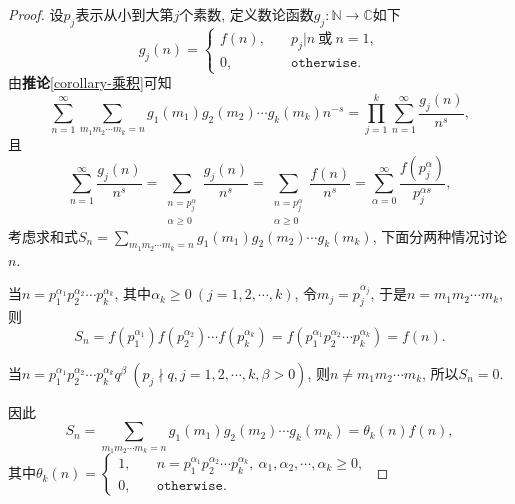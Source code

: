 \documentclass[12pt, a4paper, oneside]{ctexart}
\numberwithin{equation}{section}  %
\let\geq=\geqslant %
\def\N{\mathbb{N}}          %
\def\C{\mathbb{C}}          %
\def\add{\vspace{1ex}}      %
\begin{document}
\begin{proof}
    设$p_j$表示从小到大第$j$个素数, 定义数论函数$g_j:\N\to\C$如下
    \begin{equation*}
        g_j(n) = \begin{cases}
            f(n),&\quad p_j|n\ \text{或}\ n=1,\\
            0,&\quad\mathtt{otherwise}.
        \end{cases}
    \end{equation*}
    由\textbf{推论}\ref{corollary-乘积}可知
    \begin{equation}\label{eq-prod-1}
        \sum_{n=1}^\infty\sum_{m_1m_2\cdots m_k=n}g_1(m_1)g_2(m_2)\cdots g_k(m_k)n^{-s} = \prod_{j=1}^k\sum_{n=1}^\infty\frac{g_j(n)}{n^s},
    \end{equation}
    且
    \begin{equation}\label{eq-prod-2}
        \sum_{n=1}^\infty\frac{g_j(n)}{n^s}=\sum_{\substack{n=p_j^\alpha\\\alpha \geq 0}}\frac{g_j(n)}{n^s}=\sum_{\substack{n=p_j^\alpha\\\alpha \geq 0}}\frac{f(n)}{n^s}=\sum_{\alpha = 0}^\infty\frac{f(p_j^\alpha)}{p_j^{\alpha s}},
    \end{equation}
    考虑求和式$S_n = \sum_{m_1m_2\cdots m_k = n}g_1(m_1)g_2(m_2)\cdots g_k(m_k)$, 下面分两种情况讨论$n$.

    当$n=p_1^{\alpha_1}p_2^{\alpha_2}\cdots p_k^{\alpha_k}$, 其中$\alpha_k \geq 0\ (j=1,2,\cdots, k)$, 令$m_j = p_j^{\alpha_j}$, 于是$n = m_1m_2\cdots m_k$, 则
    \begin{equation*}
        S_n = f(p_1^{\alpha_1})f(p_2^{\alpha_2})\cdots f(p_k^{\alpha_k}) = f(p_1^{\alpha_1}p_2^{\alpha_2}\cdots p_k^{\alpha_k}) = f(n).
    \end{equation*}

    当$n = p_1^{\alpha _1}p_2^{\alpha_2}\cdots p_k^{\alpha_k}q^{\beta}\ (p_j\nmid q, j=1,2,\cdots, k, \beta > 0)$, 则$n \neq m_1m_2\cdots m_k$, 所以$S_n = 0$.

    因此
    \begin{equation}\label{eq-prod-3}
        S_n =\sum_{m_1m_2\cdots m_k = n}g_1(m_1)g_2(m_2)\cdots g_k(m_k) = \theta_k(n)f(n),
    \end{equation}
    其中$\theta_k(n) = \begin{cases}
        1,&\quad n=p_1^{\alpha_1}p_2^{\alpha_2}\cdots p_k^{\alpha_k},\ \alpha_1,\alpha_2,\cdots,\alpha_k\geq 0,\\
        0,&\quad \mathtt{otherwise}.
    \end{cases}$\add


\end{proof}
\end{document}

